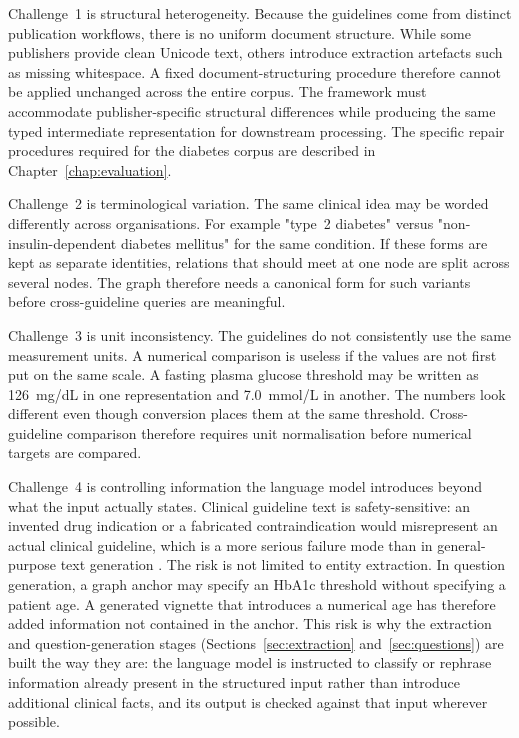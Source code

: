 Challenge~1 is structural heterogeneity. Because the guidelines come
from distinct publication workflows, there is no uniform document
structure. While some publishers provide clean Unicode text, others
introduce extraction artefacts such as missing whitespace. A fixed
document-structuring procedure therefore cannot be applied unchanged
across the entire corpus. The framework must accommodate
publisher-specific structural differences while producing the same
typed intermediate representation for downstream processing. The
specific repair procedures required for the diabetes corpus are
described in Chapter~\ref{chap:evaluation}.

Challenge~2 is terminological variation. The same clinical idea may be worded differently across organisations. For example "type~2 diabetes" versus "non-insulin-dependent diabetes mellitus" for the same condition. If these forms are kept
as separate identities, relations that should meet at one node are
split across several nodes. The graph therefore needs a canonical form
for such variants before cross-guideline queries are meaningful.

Challenge~3 is unit inconsistency. The guidelines do not consistently use the same measurement units.  A numerical comparison is useless if
the values are not first put on the same scale. A fasting plasma glucose
threshold may be written as 126~mg/dL in one representation and
7.0~mmol/L in another. The numbers look different even though conversion
places them at the same threshold. Cross-guideline comparison therefore
requires unit normalisation before numerical targets are compared.

Challenge~4 is controlling information the language model
introduces beyond what the input actually states. Clinical guideline
text is safety-sensitive: an invented drug indication or a fabricated
contraindication would misrepresent an actual clinical guideline, which
is a more serious failure mode than in general-purpose text generation
\cite{huang2025}. The risk is not limited to entity extraction. In
question generation, a graph anchor may specify an HbA1c threshold without specifying a patient age. A generated vignette that introduces a numerical age has therefore added information not contained in the anchor.
This risk is why the extraction and question-generation stages
(Sections~\ref{sec:extraction} and~\ref{sec:questions}) are built the
way they are: the language model is instructed to classify or rephrase
information already present in the structured input rather than
introduce additional clinical facts, and its output is checked against
that input wherever possible. 


